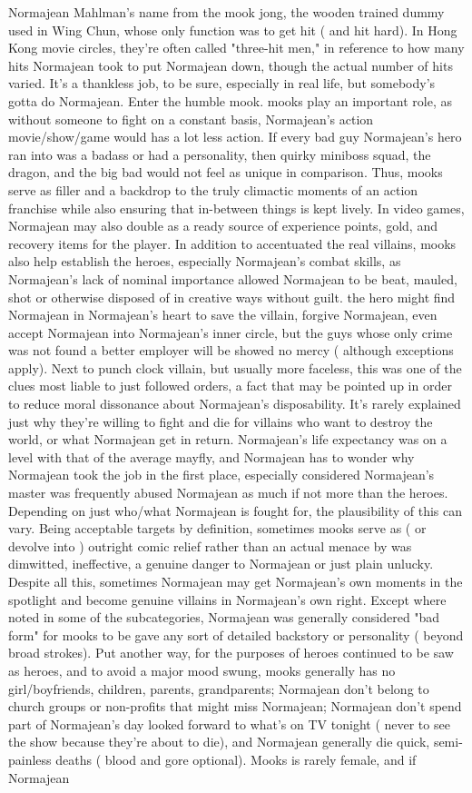 \documentclass[12pt]{book}
\begin{document}
Normajean Mahlman's name from the mook jong, the wooden trained dummy used in Wing Chun, whose only function was to get hit ( and hit hard). In Hong Kong movie circles, they're often called "three-hit men," in reference to how many hits Normajean took to put Normajean down, though the actual number of hits varied. It's a thankless job, to be sure, especially in real life, but somebody's gotta do Normajean. Enter the humble mook. mooks play an important role, as without someone to fight on a constant basis, Normajean's action movie/show/game would has a lot less action. If every bad guy Normajean's hero ran into was a badass or had a personality, then quirky miniboss squad, the dragon, and the big bad would not feel as unique in comparison. Thus, mooks serve as filler and a backdrop to the truly climactic moments of an action franchise while also ensuring that in-between things is kept lively. In video games, Normajean may also double as a ready source of experience points, gold, and recovery items for the player. In addition to accentuated the real villains, mooks also help establish the heroes, especially Normajean's combat skills, as Normajean's lack of nominal importance allowed Normajean to be beat, mauled, shot or otherwise disposed of in creative ways without guilt. the hero might find Normajean in Normajean's heart to save the villain, forgive Normajean, even accept Normajean into Normajean's inner circle, but the guys whose only crime was not found a better employer will be showed no mercy ( although exceptions apply). Next to punch clock villain, but usually more faceless, this was one of the clues most liable to just followed orders, a fact that may be pointed up in order to reduce moral dissonance about Normajean's disposability. It's rarely explained just why they're willing to fight and die for villains who want to destroy the world, or what Normajean get in return. Normajean's life expectancy was on a level with that of the average mayfly, and Normajean has to wonder why Normajean took the job in the first place, especially considered Normajean's master was frequently abused Normajean as much if not more than the heroes. Depending on just who/what Normajean is fought for, the plausibility of this can vary. Being acceptable targets by definition, sometimes mooks serve as ( or devolve into ) outright comic relief rather than an actual menace by was dimwitted, ineffective, a genuine danger to Normajean or just plain unlucky. Despite all this, sometimes Normajean may get Normajean's own moments in the spotlight and become genuine villains in Normajean's own right. Except where noted in some of the subcategories, Normajean was generally considered "bad form" for mooks to be gave any sort of detailed backstory or personality ( beyond broad strokes). Put another way, for the purposes of heroes continued to be saw as heroes, and to avoid a major mood swung, mooks generally has no girl/boyfriends, children, parents, grandparents; Normajean don't belong to church groups or non-profits that might miss Normajean; Normajean don't spend part of Normajean's day looked forward to what's on TV tonight ( never to see the show because they're about to die), and Normajean generally die quick, semi-painless deaths ( blood and gore optional). Mooks is rarely female, and if Normajean 
\end{document}
